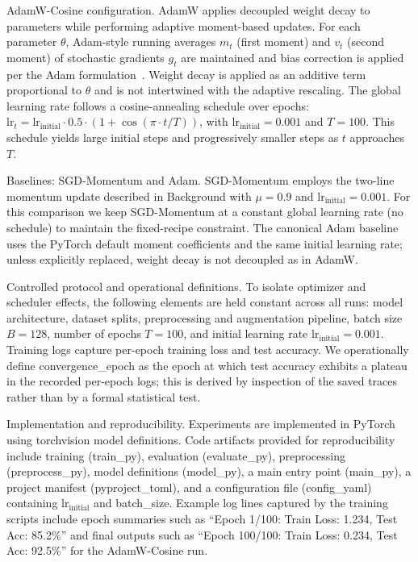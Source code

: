 \documentclass[journal,article,submit,pdftex,moreauthors]{Definitions/mdpi}
\begin{document}
AdamW-Cosine configuration. AdamW applies decoupled weight decay to parameters while performing adaptive moment-based updates. For each parameter $\theta$, Adam-style running averages $m_t$ (first moment) and $v_t$ (second moment) of stochastic gradients $g_t$ are maintained and bias correction is applied per the Adam formulation~\cite{kingma-2014-adam}. Weight decay is applied as an additive term proportional to $\theta$ and is not intertwined with the adaptive rescaling. The global learning rate follows a cosine-annealing schedule over epochs: $\mathrm{lr}_t = \mathrm{lr}_{\mathrm{initial}} \cdot 0.5 \cdot (1 + \cos(\pi \cdot t / T))$, with $\mathrm{lr}_{\mathrm{initial}} = 0.001$ and $T = 100$. This schedule yields large initial steps and progressively smaller steps as $t$ approaches $T$.

Baselines: SGD-Momentum and Adam. SGD-Momentum employs the two-line momentum update described in Background with $\mu = 0.9$ and $\mathrm{lr}_{\mathrm{initial}} = 0.001$. For this comparison we keep SGD-Momentum at a constant global learning rate (no schedule) to maintain the fixed-recipe constraint. The canonical Adam baseline uses the PyTorch default moment coefficients and the same initial learning rate; unless explicitly replaced, weight decay is not decoupled as in AdamW.

Controlled protocol and operational definitions. To isolate optimizer and scheduler effects, the following elements are held constant across all runs: model architecture, dataset splits, preprocessing and augmentation pipeline, batch size $B = 128$, number of epochs $T = 100$, and initial learning rate $\mathrm{lr}_{\mathrm{initial}} = 0.001$. Training logs capture per-epoch training loss and test accuracy. We operationally define convergence\_epoch as the epoch at which test accuracy exhibits a plateau in the recorded per-epoch logs; this is derived by inspection of the saved traces rather than by a formal statistical test.

Implementation and reproducibility. Experiments are implemented in PyTorch using torchvision model definitions. Code artifacts provided for reproducibility include training (train\_py), evaluation (evaluate\_py), preprocessing (preprocess\_py), model definitions (model\_py), a main entry point (main\_py), a project manifest (pyproject\_toml), and a configuration file (config\_yaml) containing $\mathrm{lr}_{\mathrm{initial}}$ and batch\_size. Example log lines captured by the training scripts include epoch summaries such as ``Epoch 1/100: Train Loss: 1.234, Test Acc: 85.2\%'' and final outputs such as ``Epoch 100/100: Train Loss: 0.234, Test Acc: 92.5\%'' for the AdamW-Cosine run.
\end{document}
